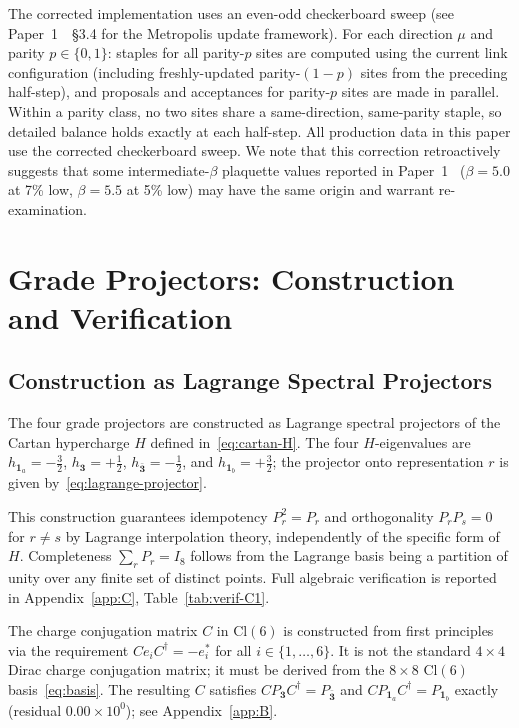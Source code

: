 \documentclass[12pt]{article}
\theoremstyle{definition}
\theoremstyle{remark}
\newcommand{\cl}{\mathrm{Cl}}           %
\begin{document}
	The corrected implementation uses an even-odd checkerboard sweep (see
	Paper~1~\cite{FirestoneP1}~\S3.4 for the Metropolis update framework).  For
	each direction $\mu$ and parity $p\in\{0,1\}$: staples for all parity-$p$
	sites are computed using the current link configuration (including
	freshly-updated parity-$(1-p)$ sites from the preceding half-step), and
	proposals and acceptances for parity-$p$ sites are made in parallel.  Within
	a parity class, no two sites share a same-direction, same-parity staple, so
	detailed balance holds exactly at each half-step.  All production data in
	this paper use the corrected checkerboard sweep.  We note that this
	correction retroactively suggests that some intermediate-$\beta$ plaquette
	values reported in Paper~1~\cite{FirestoneP1} ($\beta=5.0$ at 7\% low,
	$\beta=5.5$ at 5\% low) may have the same origin and warrant re-examination.
	
	\section{Grade Projectors: Construction and Verification}
	\label{sec:projectors}
	
	\subsection{Construction as Lagrange Spectral Projectors}
	\label{sec:proj-construction}
	
	The four grade projectors are constructed as Lagrange spectral projectors of
	the Cartan hypercharge $H$ defined in~\eqref{eq:cartan-H}.  The four
	$H$-eigenvalues are $h_{\mathbf{1}_a}=-\tfrac{3}{2}$,
	$h_{\mathbf{3}}=+\tfrac{1}{2}$, $h_{\bar{\mathbf{3}}}=-\tfrac{1}{2}$, and
	$h_{\mathbf{1}_b}=+\tfrac{3}{2}$; the projector onto representation $r$ is
	given by~\eqref{eq:lagrange-projector}.
	
	
	This construction guarantees idempotency $P_r^2=P_r$ and orthogonality
	$P_r P_s=0$ for $r\neq s$ by Lagrange interpolation theory, independently of
	the specific form of $H$.  Completeness $\sum_r P_r = I_8$ follows from the
	Lagrange basis being a partition of unity over any finite set of distinct
	points.  Full algebraic verification is reported in
	Appendix~\ref{app:C}, Table~\ref{tab:verif-C1}.
	
	The charge conjugation matrix $C$ in $\cl(6)$ is constructed from first
	principles via the requirement $C e_i C^\dagger = -e_i^*$ for all
	$i\in\{1,\ldots,6\}$.  It is not the standard $4\times4$ Dirac charge
	conjugation matrix; it must be derived from the $8\times8$ $\cl(6)$
	basis~\eqref{eq:basis}.  The resulting $C$ satisfies
	$C P_{\mathbf{3}} C^\dagger = P_{\bar{\mathbf{3}}}$ and
	$C P_{\mathbf{1}_a} C^\dagger = P_{\mathbf{1}_b}$ exactly (residual
	$0.00\times10^0$); see Appendix~\ref{app:B}.
	
\end{document}
